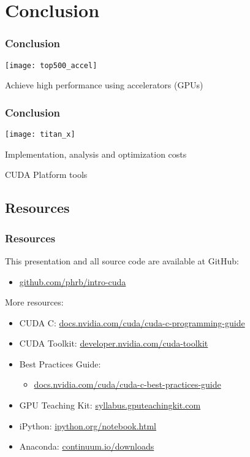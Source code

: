 \documentclass[10pt, compress]{beamer}
\begin{document}
\section{Conclusion}

\begin{frame}
    \frametitle{Conclusion}
    \centering
        \texttt{[image: top500\_accel]}
    \vfill

    Achieve \alert{high performance} using \alert{accelerators}  (\alert{GPUs})
\end{frame}

\begin{frame}
    \frametitle{Conclusion}
    \begin{center}
        \texttt{[image: titan\_x]}
    \end{center}
    \vfill


    \alert{Implementation}, \alert{analysis} and \alert{optimization} costs


    CUDA Platform \alert{tools}
\end{frame}

\subsection{Resources}

\begin{frame}
    \frametitle{Resources}
    This presentation and all source code are available
    at \alert{GitHub}:

    \begin{itemize}
        \item \url{github.com/phrb/intro-cuda}
    \end{itemize}

    More resources:

    \begin{itemize}
        \item CUDA C: \url{docs.nvidia.com/cuda/cuda-c-programming-guide}
        \item CUDA Toolkit: \url{developer.nvidia.com/cuda-toolkit}
        \item Best Practices Guide:
            \begin{itemize}
                \item \url{docs.nvidia.com/cuda/cuda-c-best-practices-guide}
            \end{itemize}
        \item GPU Teaching Kit: \url{syllabus.gputeachingkit.com}
        \item iPython: \url{ipython.org/notebook.html}
        \item Anaconda: \url{continuum.io/downloads}
    \end{itemize}
\end{frame}

\maketitle
\end{document}

